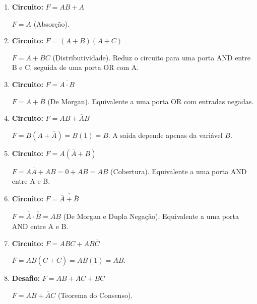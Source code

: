 \documentclass[12pt]{article}
\begin{document}
\begin{enumerate}[label=\textbf{\arabic*.}]
\item \textbf{Circuito:} $F = AB + A$
\begin{solucao}
$F = A$ (Absorção).
\end{solucao}

\item \textbf{Circuito:} $F = (A+B)(A+C)$
\begin{solucao}
$F = A + BC$ (Distributividade). Reduz o circuito para uma porta AND entre B e C, seguida de uma porta OR com A.
\end{solucao}

\item \textbf{Circuito:} $F = \overline{A \cdot B}$
\begin{solucao}
$F = \overline{A} + \overline{B}$ (De Morgan). Equivalente a uma porta OR com entradas negadas.
\end{solucao}

\item \textbf{Circuito:} $F = AB + \overline{A}B$
\begin{solucao}
$F = B(A + \overline{A}) = B(1) = B$. A saída depende apenas da variável $B$.
\end{solucao}

\item \textbf{Circuito:} $F = A(\overline{A} + B)$
\begin{solucao}
$F = A\overline{A} + AB = 0 + AB = AB$ (Cobertura). Equivalente a uma porta AND entre A e B.
\end{solucao}

\item \textbf{Circuito:} $F = \overline{\overline{A} + \overline{B}}$
\begin{solucao}
$F = \overline{\overline{A}} \cdot \overline{\overline{B}} = AB$ (De Morgan e Dupla Negação). Equivalente a uma porta AND entre A e B.
\end{solucao}

\item \textbf{Circuito:} $F = ABC + AB\overline{C}$
\begin{solucao}
$F = AB(C + \overline{C}) = AB(1) = AB$.
\end{solucao}

\item \textbf{Desafio:} $F = AB + \overline{A}C + BC$
\begin{solucao}
$F = AB + \overline{A}C$ (Teorema do Consenso).
\end{solucao}

\end{enumerate}
\end{document}
